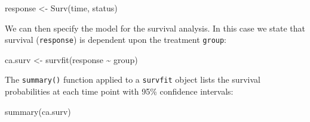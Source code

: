 \documentclass[
  12pt,
]{book}
\newenvironment{Shaded}{\begin{snugshade}}{\end{snugshade}}
\newcommand{\FunctionTok}[1]{\textcolor[rgb]{0.00,0.00,0.00}{#1}}
\newcommand{\NormalTok}[1]{#1}
\newcommand{\OtherTok}[1]{\textcolor[rgb]{0.56,0.35,0.01}{#1}}
\newcommand{\SpecialCharTok}[1]{\textcolor[rgb]{0.00,0.00,0.00}{#1}}
\begin{document}
\begin{Shaded}
\begin{Highlighting}[]
\NormalTok{response }\OtherTok{\textless{}{-}} \FunctionTok{Surv}\NormalTok{(time, status)}
\end{Highlighting}
\end{Shaded}

We can then specify the model for the survival analysis. In this case we state that survival (\texttt{response}) is dependent upon the treatment \texttt{group}:

\begin{Shaded}
\begin{Highlighting}[]
\NormalTok{ca.surv }\OtherTok{\textless{}{-}} \FunctionTok{survfit}\NormalTok{(response }\SpecialCharTok{\textasciitilde{}}\NormalTok{ group)}
\end{Highlighting}
\end{Shaded}

The \texttt{summary()} function applied to a \texttt{survfit} object lists the survival probabilities at each time point with 95\% confidence intervals:

\begin{Shaded}
\begin{Highlighting}[]
\FunctionTok{summary}\NormalTok{(ca.surv)}
\end{Highlighting}
\end{Shaded}
\end{document}

